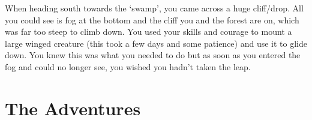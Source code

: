 When heading south towards the `swamp', you came across a huge cliff/drop. All you could see is fog at the bottom and the cliff you and the forest are on, which was far too steep to climb down. You used your skills and courage to mount a large winged creature (this took a few days and some patience) and use it to glide down. You knew this was what you needed to do but as soon as you entered the fog and could no longer see, you wished you hadn't taken the leap.

\section{The Adventures}










